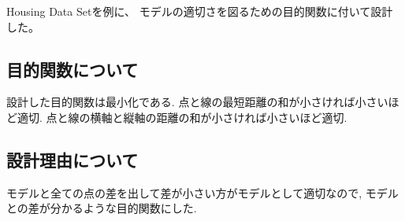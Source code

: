 Housing Data Set\cite{housingdata}を例に、
モデルの適切さを図るための目的関数に付いて設計した。

\subsection{目的関数について}
設計した目的関数は最小化である.
点と線の最短距離の和が小さければ小さいほど適切.
点と線の横軸と縦軸の距離の和が小さければ小さいほど適切. 
\subsection{設計理由について}
モデルと全ての点の差を出して差が小さい方がモデルとして適切なので,
モデルとの差が分かるような目的関数にした.


